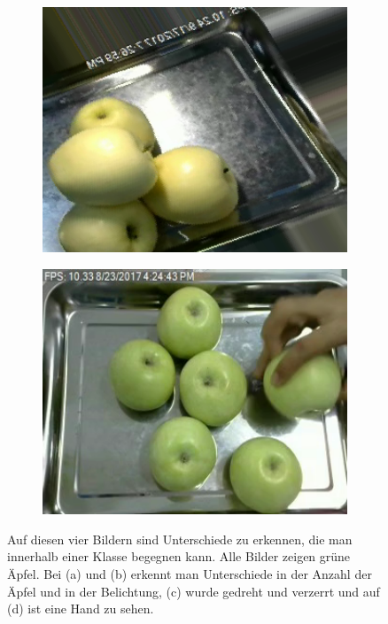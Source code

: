 \documentclass[a4,german]{article}
\begin{document}
\begin{figure}[b]
\begin{subfigure}[c]{0.245\textwidth}
\includegraphics[width=1\textwidth]{Apple_Green_10.png}
\subcaption{}
\end{subfigure}
\begin{subfigure}[c]{0.245\textwidth}
\includegraphics[width=1\textwidth]{Apple_Green_0.png}
\subcaption{}
\end{subfigure}
\caption{Auf diesen vier Bildern sind Unterschiede zu erkennen, die man innerhalb einer Klasse begegnen kann. Alle Bilder zeigen grüne Äpfel. Bei (a) und (b) erkennt man Unterschiede in der Anzahl der Äpfel und in der Belichtung, (c) wurde gedreht und verzerrt und auf (d) ist eine Hand zu sehen.}
\end{figure}
\end{document}
